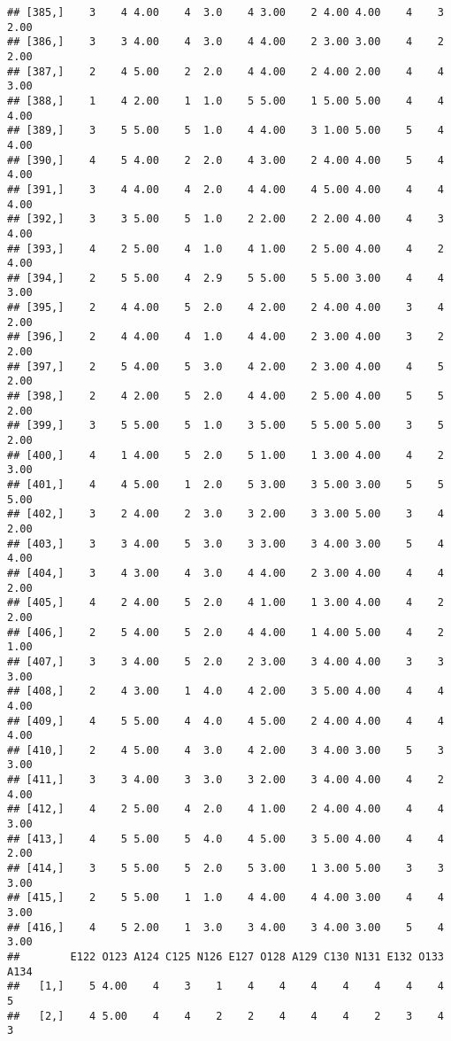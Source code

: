 \documentclass[]{article}
\begin{document}
\begin{verbatim}
## [385,]    3    4 4.00    4  3.0    4 3.00    2 4.00 4.00    4    3 2.00
## [386,]    3    3 4.00    4  3.0    4 4.00    2 3.00 3.00    4    2 2.00
## [387,]    2    4 5.00    2  2.0    4 4.00    2 4.00 2.00    4    4 3.00
## [388,]    1    4 2.00    1  1.0    5 5.00    1 5.00 5.00    4    4 4.00
## [389,]    3    5 5.00    5  1.0    4 4.00    3 1.00 5.00    5    4 4.00
## [390,]    4    5 4.00    2  2.0    4 3.00    2 4.00 4.00    5    4 4.00
## [391,]    3    4 4.00    4  2.0    4 4.00    4 5.00 4.00    4    4 4.00
## [392,]    3    3 5.00    5  1.0    2 2.00    2 2.00 4.00    4    3 4.00
## [393,]    4    2 5.00    4  1.0    4 1.00    2 5.00 4.00    4    2 4.00
## [394,]    2    5 5.00    4  2.9    5 5.00    5 5.00 3.00    4    4 3.00
## [395,]    2    4 4.00    5  2.0    4 2.00    2 4.00 4.00    3    4 2.00
## [396,]    2    4 4.00    4  1.0    4 4.00    2 3.00 4.00    3    2 2.00
## [397,]    2    5 4.00    5  3.0    4 2.00    2 3.00 4.00    4    5 2.00
## [398,]    2    4 2.00    5  2.0    4 4.00    2 5.00 4.00    5    5 2.00
## [399,]    3    5 5.00    5  1.0    3 5.00    5 5.00 5.00    3    5 2.00
## [400,]    4    1 4.00    5  2.0    5 1.00    1 3.00 4.00    4    2 3.00
## [401,]    4    4 5.00    1  2.0    5 3.00    3 5.00 3.00    5    5 5.00
## [402,]    3    2 4.00    2  3.0    3 2.00    3 3.00 5.00    3    4 2.00
## [403,]    3    3 4.00    5  3.0    3 3.00    3 4.00 3.00    5    4 4.00
## [404,]    3    4 3.00    4  3.0    4 4.00    2 3.00 4.00    4    4 2.00
## [405,]    4    2 4.00    5  2.0    4 1.00    1 3.00 4.00    4    2 2.00
## [406,]    2    5 4.00    5  2.0    4 4.00    1 4.00 5.00    4    2 1.00
## [407,]    3    3 4.00    5  2.0    2 3.00    3 4.00 4.00    3    3 3.00
## [408,]    2    4 3.00    1  4.0    4 2.00    3 5.00 4.00    4    4 4.00
## [409,]    4    5 5.00    4  4.0    4 5.00    2 4.00 4.00    4    4 4.00
## [410,]    2    4 5.00    4  3.0    4 2.00    3 4.00 3.00    5    3 3.00
## [411,]    3    3 4.00    3  3.0    3 2.00    3 4.00 4.00    4    2 4.00
## [412,]    4    2 5.00    4  2.0    4 1.00    2 4.00 4.00    4    4 3.00
## [413,]    4    5 5.00    5  4.0    4 5.00    3 5.00 4.00    4    4 2.00
## [414,]    3    5 5.00    5  2.0    5 3.00    1 3.00 5.00    3    3 3.00
## [415,]    2    5 5.00    1  1.0    4 4.00    4 4.00 3.00    4    4 3.00
## [416,]    4    5 2.00    1  3.0    3 4.00    3 4.00 3.00    5    4 3.00
##        E122 O123 A124 C125 N126 E127 O128 A129 C130 N131 E132 O133 A134
##   [1,]    5 4.00    4    3    1    4    4    4    4    4    4    4    5
##   [2,]    4 5.00    4    4    2    2    4    4    4    2    3    4    3

\end{verbatim}
\end{document}
